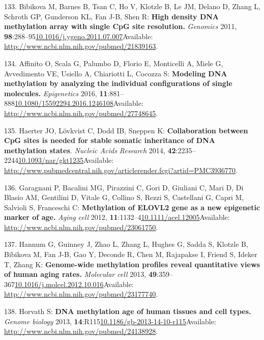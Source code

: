 \documentclass[
]{book}
\begin{document}
\leavevmode\hypertarget{ref-Bibikova2011}{}%
133. Bibikova M, Barnes B, Tsan C, Ho V, Klotzle B, Le JM, Delano D, Zhang L, Schroth GP, Gunderson KL, Fan J-B, Shen R: \textbf{High density DNA methylation array with single CpG site resolution.} \emph{Genomics} 2011, \textbf{98}:288--95\href{https://doi.org/10.1016/j.ygeno.2011.07.007}{10.1016/j.ygeno.2011.07.007}Available: \url{http://www.ncbi.nlm.nih.gov/pubmed/21839163}.

\leavevmode\hypertarget{ref-Affinito2016}{}%
134. Affinito O, Scala G, Palumbo D, Florio E, Monticelli A, Miele G, Avvedimento VE, Usiello A, Chiariotti L, Cocozza S: \textbf{Modeling DNA methylation by analyzing the individual configurations of single molecules.} \emph{Epigenetics} 2016, \textbf{11}:881--888\href{https://doi.org/10.1080/15592294.2016.1246108}{10.1080/15592294.2016.1246108}Available: \url{http://www.ncbi.nlm.nih.gov/pubmed/27748645}.

\leavevmode\hypertarget{ref-Haerter2014}{}%
135. Haerter JO, Lövkvist C, Dodd IB, Sneppen K: \textbf{Collaboration between CpG sites is needed for stable somatic inheritance of DNA methylation states}. \emph{Nucleic Acids Research} 2014, \textbf{42}:2235--2244\href{https://doi.org/10.1093/nar/gkt1235}{10.1093/nar/gkt1235}Available: \url{http://www.pubmedcentral.nih.gov/articlerender.fcgi?artid=PMC3936770}.

\leavevmode\hypertarget{ref-Garagnani2012}{}%
136. Garagnani P, Bacalini MG, Pirazzini C, Gori D, Giuliani C, Mari D, Di Blasio AM, Gentilini D, Vitale G, Collino S, Rezzi S, Castellani G, Capri M, Salvioli S, Franceschi C: \textbf{Methylation of ELOVL2 gene as a new epigenetic marker of age.} \emph{Aging cell} 2012, \textbf{11}:1132--4\href{https://doi.org/10.1111/acel.12005}{10.1111/acel.12005}Available: \url{http://www.ncbi.nlm.nih.gov/pubmed/23061750}.

\leavevmode\hypertarget{ref-Hannum2013}{}%
137. Hannum G, Guinney J, Zhao L, Zhang L, Hughes G, Sadda S, Klotzle B, Bibikova M, Fan J-B, Gao Y, Deconde R, Chen M, Rajapakse I, Friend S, Ideker T, Zhang K: \textbf{Genome-wide methylation profiles reveal quantitative views of human aging rates.} \emph{Molecular cell} 2013, \textbf{49}:359--367\href{https://doi.org/10.1016/j.molcel.2012.10.016}{10.1016/j.molcel.2012.10.016}Available: \url{http://www.ncbi.nlm.nih.gov/pubmed/23177740}.

\leavevmode\hypertarget{ref-Horvath2013}{}%
138. Horvath S: \textbf{DNA methylation age of human tissues and cell types.} \emph{Genome biology} 2013, \textbf{14}:R115\href{https://doi.org/10.1186/gb-2013-14-10-r115}{10.1186/gb-2013-14-10-r115}Available: \url{http://www.ncbi.nlm.nih.gov/pubmed/24138928}.
\end{document}
